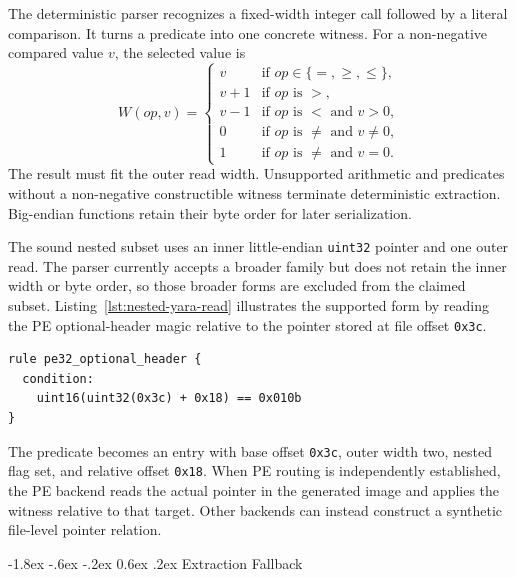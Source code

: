 \documentclass[11pt,twocolumn]{article}
\makeatletter
\newcommand{\code}[1]{\texttt{#1}}
\renewcommand\subsection{\@startsection{subsection}{2}{\z@}%
  {-1.8ex \@plus -.6ex \@minus -.2ex}%
  {0.6ex \@plus .2ex}%
  {\normalfont\normalsize\bfseries}}
\makeatother
\begin{document}
The deterministic parser recognizes a fixed-width integer call followed by a
literal comparison. It turns a predicate into one concrete witness. For a
non-negative compared value $v$, the selected value is
\begin{equation}
W(op,v)=
\begin{cases}
v       & \text{if } op\in\{=,\geq,\leq\},\\
v+1     & \text{if } op \text{ is } {>},\\
v-1     & \text{if } op \text{ is } {<} \text{ and } v>0,\\
0       & \text{if } op \text{ is } \neq \text{ and } v\neq 0,\\
1       & \text{if } op \text{ is } \neq \text{ and } v=0.
\end{cases}
\end{equation}
The result must fit the outer read width. Unsupported arithmetic and predicates
without a non-negative constructible witness terminate deterministic extraction.
Big-endian functions retain their byte order for later serialization.

The sound nested subset uses an inner little-endian \code{uint32} pointer and
one outer read. The parser currently accepts a broader family but does not retain
the inner width or byte order, so those broader forms are excluded from the
claimed subset. Listing~\ref{lst:nested-yara-read} illustrates the supported
form by reading the PE optional-header magic relative to the pointer stored at
file offset \code{0x3c}.
\begin{minipage}{\linewidth}
\begin{lstlisting}[language=YARA,caption={Nested YARA read represented by the integer extractor.},label={lst:nested-yara-read}]
rule pe32_optional_header {
  condition:
    uint16(uint32(0x3c) + 0x18) == 0x010b
}
\end{lstlisting}
\end{minipage}
The predicate becomes an entry with base offset \code{0x3c}, outer width two,
nested flag set,
and relative offset \code{0x18}. When PE routing is independently established,
the PE backend reads the actual pointer in the generated image and applies the
witness relative to that target. Other backends can instead construct a
synthetic file-level pointer relation.

\subsection{Extraction Fallback}
\end{document}
